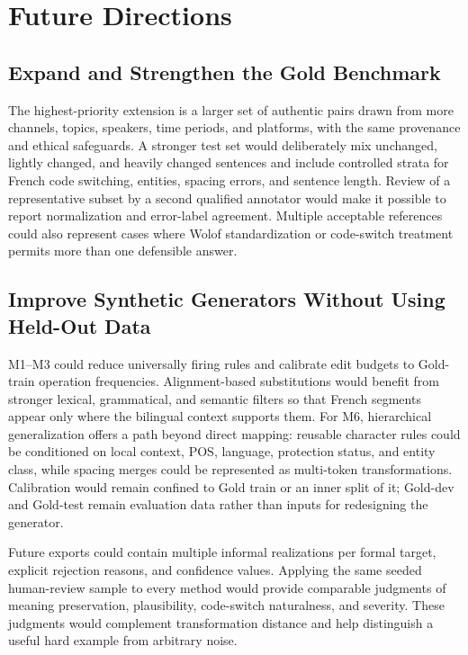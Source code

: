 \documentclass[12pt, a4paper, twoside, openany]{report}
\begin{document}
\section{Future Directions}

\subsection{Expand and Strengthen the Gold Benchmark}

The highest-priority extension is a larger set of authentic pairs drawn from more channels, topics, speakers, time periods, and platforms, with the same provenance and ethical safeguards. A stronger test set would deliberately mix unchanged, lightly changed, and heavily changed sentences and include controlled strata for French code switching, entities, spacing errors, and sentence length. Review of a representative subset by a second qualified annotator would make it possible to report normalization and error-label agreement. Multiple acceptable references could also represent cases where Wolof standardization or code-switch treatment permits more than one defensible answer.

\subsection{Improve Synthetic Generators Without Using Held-Out Data}

M1--M3 could reduce universally firing rules and calibrate edit budgets to Gold-train operation frequencies. Alignment-based substitutions would benefit from stronger lexical, grammatical, and semantic filters so that French segments appear only where the bilingual context supports them. For M6, hierarchical generalization offers a path beyond direct mapping: reusable character rules could be conditioned on local context, POS, language, protection status, and entity class, while spacing merges could be represented as multi-token transformations. Calibration would remain confined to Gold train or an inner split of it; Gold-dev and Gold-test remain evaluation data rather than inputs for redesigning the generator.

Future exports could contain multiple informal realizations per formal target, explicit rejection reasons, and confidence values. Applying the same seeded human-review sample to every method would provide comparable judgments of meaning preservation, plausibility, code-switch naturalness, and severity. These judgments would complement transformation distance and help distinguish a useful hard example from arbitrary noise.
\end{document}
